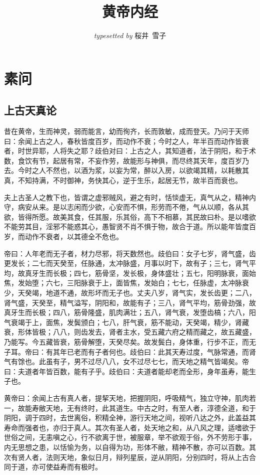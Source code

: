 \documentclass[fontset=founder]{ctexart}
\title{黄帝内经}
\author{\textit{typesetted by} 桜井\ 雪子}
\date{}
\begin{document}
\maketitle
\tableofcontents

\section{素问}

\subsection{上古天真论}

昔在黄帝，生而神灵，弱而能言，幼而徇齐，长而敦敏，成而登天。乃问于天师曰：余闻上古之人，春秋皆度百岁，而动作不衰；今时之人，年半百而动作皆衰者，时世异耶，人将失之耶？歧伯对曰：上古之人，其知道者，法于阴阳，和于术数，食饮有节，起居有常，不妄作劳，故能形与神俱，而尽终其天年，度百岁乃去。今时之人不然也，以酒为浆，以妄为常，醉以入房，以欲竭其精，以耗散其真，不知持满，不时御神，务快其心，逆于生乐，起居无节，故半百而衰也。

夫上古圣人之教下也，皆谓之虚邪贼风，避之有时，恬惔虚无，真气从之，精神内守，病安从来。是以志闲而少欲，心安而不惧，形劳而不倦，气从以顺，各从其欲，皆得所愿。故美其食，任其服，乐其俗，高下不相慕，其民故曰朴。是以嗜欲不能劳其目，淫邪不能惑其心，愚智贤不肖不惧于物，故合于道。所以能年皆度百岁，而动作不衰者，以其德全不危也。

帝曰：人年老而无子者，材力尽邪，将天数然也。歧伯曰：女子七岁，肾气盛，齿更发长；二七而天癸至，任脉通，太冲脉盛，月事以时下，故有子；三七，肾气平均，故真牙生而长极；四七，筋骨坚，发长极，身体盛壮；五七，阳明脉衰，面始焦，发始堕；六七，三阳脉衰于上，面皆焦，发始白；七七，任脉虚，太冲脉衰少，天癸竭，地道不通，故形坏而无子也。丈夫八岁，肾气实，发长齿更；二八，肾气盛，天癸至，精气溢写，阴阳和，故能有子；三八，肾气平均，筋骨劲强，故真牙生而长极；四八，筋骨隆盛，肌肉满壮；五八，肾气衰，发堕齿槁；六八，阳气衰竭于上，面焦，发鬓颁白；七八，肝气衰，筋不能动，天癸竭，精少，肾藏衰，形体皆极；八八，则齿发去，肾者主水，受五藏六府之精而藏之，故五藏盛，乃能写。今五藏皆衰，筋骨解堕，天癸尽矣。故发鬓白，身体重，行步不正，而无子耳。帝曰：有其年已老而有子者何也。歧伯曰：此其天寿过度，气脉常通，而肾气有馀也。此虽有子，男不过尽八八，女不过尽七七，而天地之精气皆竭矣。帝曰：夫道者年皆百数，能有子乎。歧伯曰：夫道者能却老而全形，身年虽寿，能生子也。

黄帝曰：余闻上古有真人者，提挈天地，把握阴阳，呼吸精气，独立守神，肌肉若一，故能寿敝天地，无有终时，此其道生。中古之时，有至人者，淳德全道，和于阴阳，调于四时，去世离俗，积精全神，游行天地之间，视听八达之外，此盖益其寿命而强者也，亦归于真人。其次有圣人者，处天地之和，从八风之理，适嗜欲于世俗之间，无恚嗔之心，行不欲离于世，被服章，举不欲观于俗，外不劳形于事，内无思想之患，以恬愉为务，以自得为功，形体不敝，精神不散，亦可以百数。其次有贤人者，法则天地，象似日月，辩列星辰，逆从阴阳，分别四时，将从上古合同于道，亦可使益寿而有极时。
\end{document}
